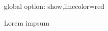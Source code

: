 \documentclass{article}
\begin{document}
{global option: show,linecolor=red}


Lorem
impsum
\end{document}
